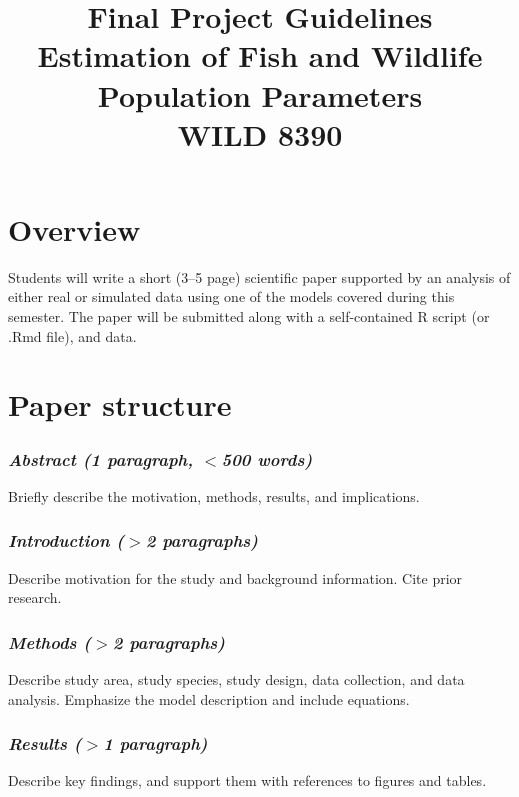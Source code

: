 \documentclass[12pt]{article}
\title{Final Project Guidelines \\ Estimation of Fish and Wildlife Population Parameters \\ WILD 8390}
\date{}
\begin{document}

\maketitle

\vspace{-48pt}

\section*{Overview}

Students will write a short (3--5 page) scientific paper supported by
an analysis of either real or simulated data using one of the models
covered during this semester. The paper will be submitted
along with a self-contained R script (or .Rmd file), and data.


\section*{Paper structure}

\subsubsection*{\it Abstract \normalfont (1 paragraph, $<$500 words)}
\vspace{-6pt}
Briefly describe the motivation, methods, results, and
implications. %

\subsubsection*{\it Introduction \normalfont ($>$2 paragraphs)}
\vspace{-6pt}
Describe motivation for the study and background information. Cite
prior research. 

\subsubsection*{\it Methods \normalfont ($>$2 paragraphs)}
\vspace{-6pt}
Describe study area, study species, study design, data collection, and
data analysis. Emphasize the model description and include equations.

\subsubsection*{\it Results \normalfont ($>$1 paragraph)}
\vspace{-6pt}
Describe key findings, and support them with references to figures and tables.
\end{document}
